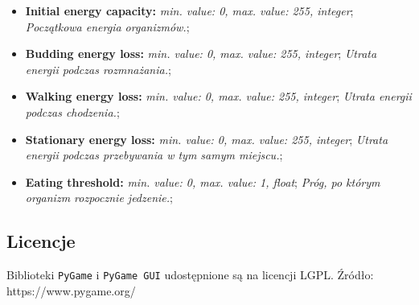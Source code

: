 \documentclass[a4paper]{article}
\begin{document}
\begin{itemize}
\item
  \textbf{Initial energy capacity:} \emph{min. value: 0, max. value:
  255, integer}; \emph{Początkowa energia organizmów.};
\item
  \textbf{Budding energy loss:} \emph{min. value: 0, max. value: 255,
  integer}; \emph{Utrata energii podczas rozmnażania.};
\item
  \textbf{Walking energy loss:} \emph{min. value: 0, max. value: 255,
  integer}; \emph{Utrata energii podczas chodzenia.};
\item
  \textbf{Stationary energy loss:} \emph{min. value: 0, max. value: 255,
  integer}; \emph{Utrata energii podczas przebywania w tym samym
  miejscu.};
\item
  \textbf{Eating threshold:} \emph{min. value: 0, max. value: 1, float};
  \emph{Próg, po którym organizm rozpocznie jedzenie.};
\end{itemize}

\subsection{Licencje}\label{licencje}

Biblioteki \texttt{PyGame} i \texttt{PyGame GUI} udostępnione są na
licencji LGPL. Źródło: https://www.pygame.org/
\end{document}
